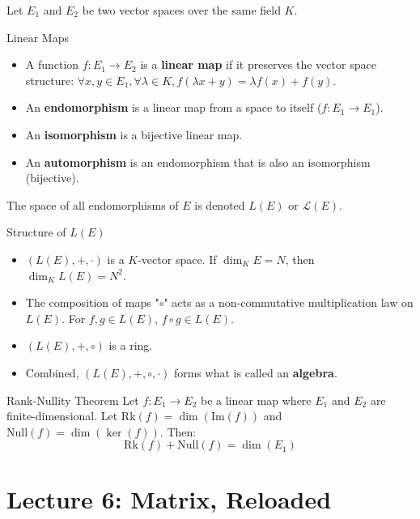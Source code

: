\documentclass[11pt, a4paper]{article}
\begin{document}
Let $E_1$ and $E_2$ be two vector spaces over the same field $K$. 

\begin{definition}{Linear Maps}{}
\begin{itemize}
    \item A function $f: E_1 \to E_2$ is a \textbf{linear map} if it preserves the vector space structure: $\forall x, y \in E_1, \forall \lambda \in K, f(\lambda x + y) = \lambda f(x) + f(y)$. 
    \item An \textbf{endomorphism} is a linear map from a space to itself ($f: E_1 \to E_1$). 
    \item An \textbf{isomorphism} is a bijective linear map. 
    \item An \textbf{automorphism} is an endomorphism that is also an isomorphism (bijective). 
\end{itemize}
The space of all endomorphisms of $E$ is denoted $L(E)$ or $\mathcal{L}(E)$. 
\end{definition}

\begin{proposition}{Structure of $L(E)$}{}
\begin{itemize}
    \item $(L(E), +, \cdot)$ is a $K$-vector space. If $\dim_K E = N$, then $\dim_K L(E) = N^2$. 
    \item The composition of maps "${\circ}$" acts as a non-commutative multiplication law on $L(E)$. For $f, g \in L(E)$, $f \circ g \in L(E)$. 
    \item $(L(E), +, \circ)$ is a ring. 
    \item Combined, $(L(E), +, \circ, \cdot)$ forms what is called an \textbf{algebra}. 
\end{itemize}
\end{proposition}

\begin{theorem}{Rank-Nullity Theorem}{}
Let $f: E_1 \to E_2$ be a linear map where $E_1$ and $E_2$ are finite-dimensional. 
Let $\text{Rk}(f) = \dim(\text{Im}(f))$ and $\text{Null}(f) = \dim(\ker(f))$. 
Then:
$$ \text{Rk}(f) + \text{Null}(f) = \dim(E_1) $$ 
\end{theorem}

\section{Lecture 6: Matrix, Reloaded}
\end{document}
